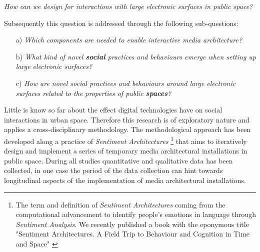   \textit{How can we design for interactions with large electronic surfaces in public space?}

 
\noindent Subsequently this question is addressed through the following sub-questions:
  
  \begin{enumerate}
  
  \item  [a)] \textit{Which components are needed to enable interactive media architecture?}
 
 \item  [b)] \textit{What kind of novel \textbf{social} practices and behaviours emerge when setting up large electronic surfaces?}
 
 \item  [c)] \textit{How are novel social practices and behaviours around large electronic surfaces related to the properties of public \textbf{spaces}?}

\end{enumerate}


Little is know so far about the effect digital technologies have on social interactions in urban space. Therefore this research is of exploratory nature and applies a cross-disciplinary methodology.  
The methodological approach has been developed along a practice of \textit{Sentiment Architectures} \footnote{The term and definition of \textit{Sentiment Architectures} coming from the computational advancement to identify people’s emotions in language through \textit{Sentiment Analysis}. We recently published a book with the eponymous title "Sentiment Architectures. A Field Trip to Behaviour and Cognition in Time and Space" \cite{Behrens_2016} } that aims to iteratively design and implement a series of temporary media architectural installations in public space. During all studies quantitative and qualitative data has been collected, in one case the period of the data collection can hint towards longitudinal aspects of the implementation of media architectural installations. 

